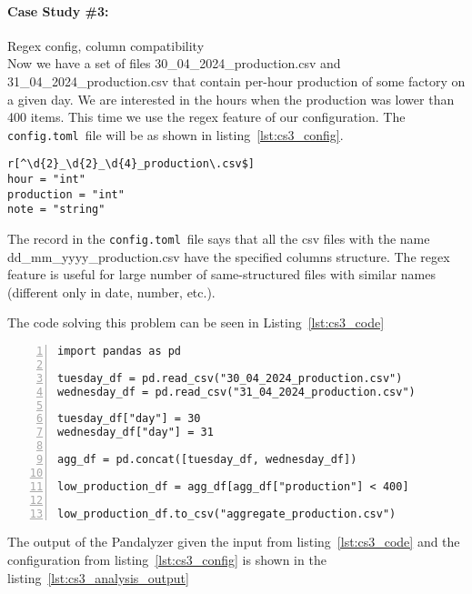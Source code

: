\paragraph{Case Study \#3:} Regex config, column compatibility \\

Now we have a set of files 30\_04\_2024\_production.csv and 31\_04\_2024\_production.csv that contain per-hour production
of some factory on a given day.
We are interested in the hours when the production was lower than 400 items.
This time we use the regex feature of our configuration.
The \verb|config.toml|~file will be as shown in listing~\ref{lst:cs3_config}.

\begin{lstlisting}[caption=config.toml of the second case study, label={lst:cs3_config}, captionpos=b]
r[^\d{2}_\d{2}_\d{4}_production\.csv$]
hour = "int"
production = "int"
note = "string"
\end{lstlisting}

The record in the \verb|config.toml|~file says that all the csv files with the name dd\_mm\_yyyy\_production.csv have the
specified columns structure.
The regex feature is useful for large number of same-structured files with similar names (different only in date,
number, etc.).

The code solving this problem can be seen in Listing~\ref{lst:cs3_code}

\begin{lstlisting}[caption=Solution of the third case study in Pandas, label={lst:cs3_code}, captionpos=b, numbers=left]
import pandas as pd

tuesday_df = pd.read_csv("30_04_2024_production.csv")
wednesday_df = pd.read_csv("31_04_2024_production.csv")

tuesday_df["day"] = 30
wednesday_df["day"] = 31

agg_df = pd.concat([tuesday_df, wednesday_df])

low_production_df = agg_df[agg_df["production"] < 400]

low_production_df.to_csv("aggregate_production.csv")
\end{lstlisting}

The output of the Pandalyzer given the input from listing~\ref{lst:cs3_code} and the configuration from
listing~\ref{lst:cs3_config} is shown in the listing~\ref{lst:cs3_analysis_output}

